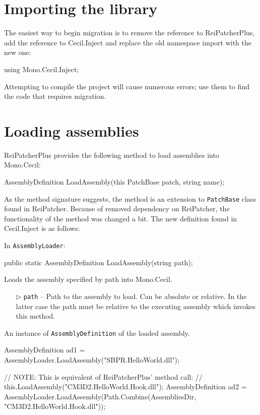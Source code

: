 \documentclass[a4paper,11pt]{article}
\newcommand{\CecilInject}{\textsc{C}{\scriptsize \sc ecil}.\textsc{I}{\scriptsize \sc nject}}
\begin{document}
\section{Importing the library}
The easiest way to begin migration is to remove the reference to ReiPatcherPlus, add the reference to \CecilInject{} and replace the old namespace import with the new one:
\begin{cs}
using Mono.Cecil.Inject;
\end{cs}
Attempting to compile the project will cause numerous errors; use them to find the code that requires migration.

\section{Loading assemblies}
ReiPatcherPlus provides the following method to load assemblies into Mono.Cecil:
\begin{cs}
AssemblyDefinition LoadAssembly(this PatchBase patch, string name);
\end{cs}
\vspace{-1em}
As the method signature suggests, the method is an extension to \texttt{PatchBase} class found in ReiPatcher. Because of removed dependency on ReiPatcher, the functionality of the method was changed a bit. The new definition found in \CecilInject{} is as follows:
\begin{mdef}
In \texttt{AssemblyLoader}:
\begin{cs}
public static AssemblyDefinition LoadAssembly(string path);
\end{cs}
Loads the assembly specified by path into Mono.Cecil.
\begin{itemize}
\item[$\triangleright$] \texttt{path} -- Path to the assembly to load. Can be absolute or relative. In the latter case the path must be relative to the executing assembly which invokes this method.
\end{itemize}
An instance of \texttt{AssemblyDefinition} of the loaded assembly.
\begin{cs}
	AssemblyDefinition ad1 = AssemblyLoader.LoadAssembly("SBPR.HelloWorld.dll");
	
	// NOTE: This is equivalent of ReiPatcherPlus' method call:
	// this.LoadAssembly("CM3D2.HelloWorld.Hook.dll");
	AssemblyDefinition ad2 = AssemblyLoader.LoadAssembly(Path.Combine(AssembliesDir, "CM3D2.HelloWorld.Hook.dll"));
\end{cs}
\end{mdef}
\end{document}
